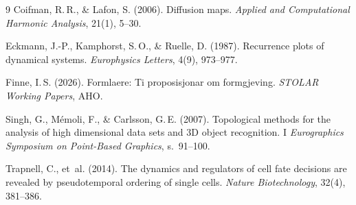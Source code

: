 \documentclass[10pt, a4paper, twocolumn]{article}
\begin{document}


\begin{thebibliography}{9}
Coifman, R.\,R., \& Lafon, S. (2006). Diffusion maps. \textit{Applied and Computational Harmonic Analysis}, 21(1), 5--30.

Eckmann, J.-P., Kamphorst, S.\,O., \& Ruelle, D. (1987). Recurrence plots of dynamical systems. \textit{Europhysics Letters}, 4(9), 973--977.

Finne, I.\,S. (2026). Formlaere: Ti proposisjonar om formgjeving. \textit{STOLAR Working Papers}, AHO.

Singh, G., M\'{e}moli, F., \& Carlsson, G.\,E. (2007). Topological methods for the analysis of high dimensional data sets and 3D object recognition. I \textit{Eurographics Symposium on Point-Based Graphics}, s.~91--100.

Trapnell, C., et~al. (2014). The dynamics and regulators of cell fate decisions are revealed by pseudotemporal ordering of single cells. \textit{Nature Biotechnology}, 32(4), 381--386.
\end{thebibliography}
\end{document}
